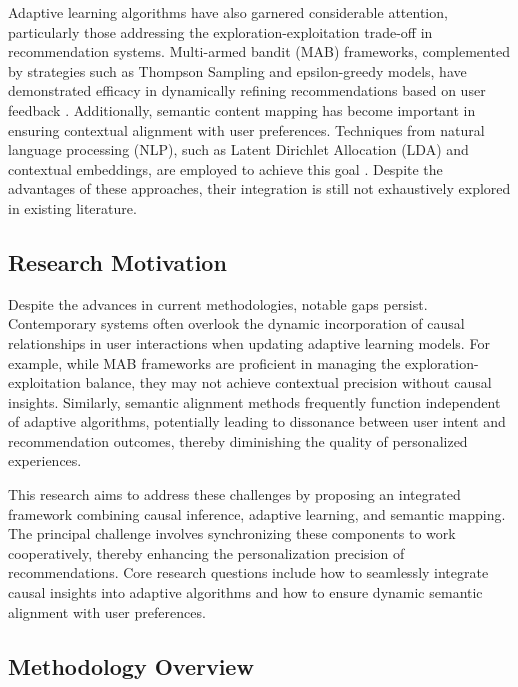 \documentclass{article} %
\begin{document}
Adaptive learning algorithms have also garnered considerable attention, particularly those addressing the exploration-exploitation trade-off in recommendation systems. Multi-armed bandit (MAB) frameworks, complemented by strategies such as Thompson Sampling and epsilon-greedy models, have demonstrated efficacy in dynamically refining recommendations based on user feedback \citep{Gittins2011Multi}. Additionally, semantic content mapping has become important in ensuring contextual alignment with user preferences. Techniques from natural language processing (NLP), such as Latent Dirichlet Allocation (LDA) and contextual embeddings, are employed to achieve this goal \citep{Blei2003LDA}. Despite the advantages of these approaches, their integration is still not exhaustively explored in existing literature.

\subsection{Research Motivation}

Despite the advances in current methodologies, notable gaps persist. Contemporary systems often overlook the dynamic incorporation of causal relationships in user interactions when updating adaptive learning models. For example, while MAB frameworks are proficient in managing the exploration-exploitation balance, they may not achieve contextual precision without causal insights. Similarly, semantic alignment methods frequently function independent of adaptive algorithms, potentially leading to dissonance between user intent and recommendation outcomes, thereby diminishing the quality of personalized experiences.

This research aims to address these challenges by proposing an integrated framework combining causal inference, adaptive learning, and semantic mapping. The principal challenge involves synchronizing these components to work cooperatively, thereby enhancing the personalization precision of recommendations. Core research questions include how to seamlessly integrate causal insights into adaptive algorithms and how to ensure dynamic semantic alignment with user preferences.

\subsection{Methodology Overview}
\end{document}
